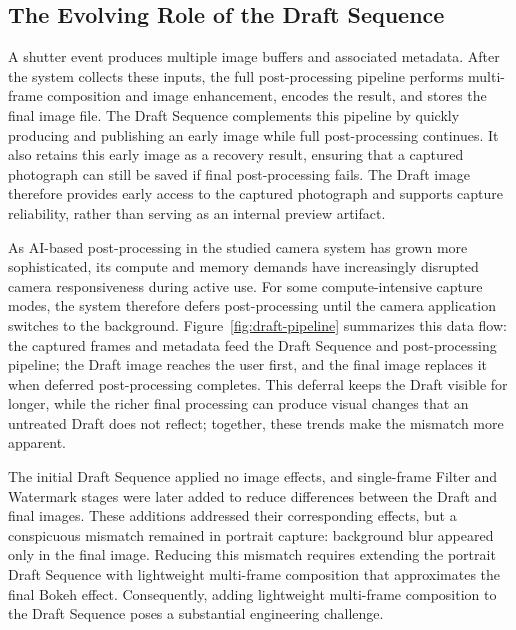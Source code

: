 \subsection{The Evolving Role of the Draft Sequence}
\label{sec:draft-background}

A shutter event produces multiple image buffers and associated metadata. After
the system collects these inputs, the full post-processing pipeline performs
multi-frame composition and image enhancement, encodes the result, and stores
the final image file. The Draft Sequence complements this pipeline by quickly
producing and publishing an early image while full post-processing continues.
It also retains this early image as a recovery result, ensuring that a captured
photograph can still be saved if final post-processing fails. The Draft image
therefore provides early access to the captured photograph and supports capture
reliability, rather than serving as an internal preview artifact.

As AI-based post-processing in the studied camera system has grown more
sophisticated, its compute and memory demands have increasingly disrupted
camera responsiveness during active use. For some compute-intensive capture
modes, the system therefore defers post-processing until the camera application
switches to the background.
Figure~\ref{fig:draft-pipeline} summarizes this data flow: the captured frames
and metadata feed the Draft Sequence and post-processing pipeline; the Draft
image reaches the user first, and the final image replaces it when deferred
post-processing completes. This deferral keeps the Draft visible for longer,
while the richer final processing can produce visual changes that an untreated
Draft does not reflect; together, these trends make the mismatch more apparent.

The initial Draft Sequence applied no image effects, and single-frame Filter
and Watermark stages were later added to reduce differences between the Draft
and final images. These additions addressed their corresponding effects, but a
conspicuous mismatch remained in portrait capture: background blur appeared
only in the final image. Reducing this mismatch requires extending the portrait
Draft Sequence with lightweight multi-frame composition that approximates the
final Bokeh effect. Consequently, adding lightweight multi-frame composition to
the Draft Sequence poses a substantial engineering challenge.


